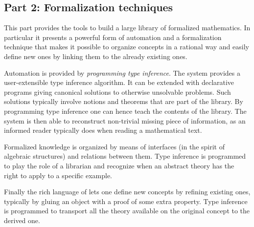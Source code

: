 
\subsection*{Part 2: Formalization techniques}

This part provides the tools to build a large library of formalized
mathematics.  In particular it presents a powerful form of automation
and a formalization technique that makes it possible to organize
concepts in a rational way and easily define new ones by linking them
to the already existing ones.

Automation is provided by \emph{programming type inference}.
The \Coq{} system provides a user-extensible type inference
algorithm.  It can be extended with declarative programs
giving canonical solutions to otherwise unsolvable problems.
Such solutions typically involve notions and theorems that
are part of the \mcbMC{} library.  By programming type inference
one can hence teach \Coq{} the contents of the library.  The system
is then able to reconstruct non-trivial missing piece of information,
as an informed reader typically does when reading a mathematical text.

Formalized knowledge is organized by means of interfaces (in the spirit of
algebraic structures) and relations between them.  Type inference is programmed
to play the role of a librarian and recognize when an abstract theory has the
right to apply to a specific example.

Finally the rich language of \Coq{} lets one define new concepts
by refining existing ones, typically by gluing an object with
a proof of some extra property.  Type inference is programmed
to transport all the theory available on
the original concept to the derived one.



